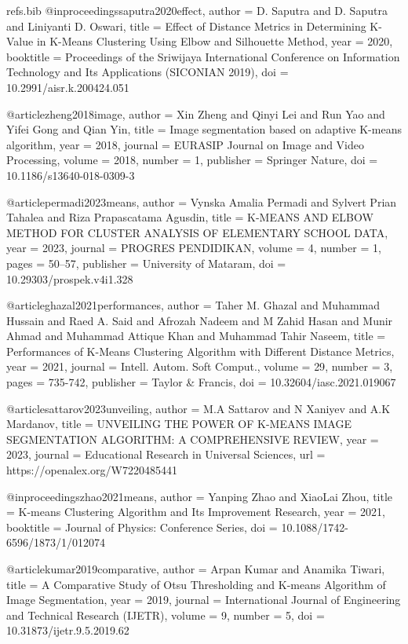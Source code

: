 \begin{filecontents*}[overwrite]{refs.bib}
@inproceedings{saputra2020effect,
  author = {D. Saputra and D. Saputra and Liniyanti D. Oswari},
  title = {{Effect of Distance Metrics in Determining K-Value in K-Means Clustering Using Elbow and Silhouette Method}},
  year = {2020},
  booktitle = {Proceedings of the Sriwijaya International Conference on Information Technology and Its Applications (SICONIAN 2019)},
  doi = {10.2991/aisr.k.200424.051}
}

@article{zheng2018image,
  author = {Xin Zheng and Qinyi Lei and Run Yao and Yifei Gong and Qian Yin},
  title = {{Image segmentation based on adaptive K-means algorithm}},
  year = {2018},
  journal = {EURASIP Journal on Image and Video Processing},
  volume = {2018},
  number = {1},
  publisher = {Springer Nature},
  doi = {10.1186/s13640-018-0309-3}
}

@article{permadi2023means,
  author = {Vynska Amalia Permadi and Sylvert Prian Tahalea and Riza Prapascatama Agusdin},
  title = {{K-MEANS AND ELBOW METHOD FOR CLUSTER ANALYSIS OF ELEMENTARY SCHOOL DATA}},
  year = {2023},
  journal = {PROGRES PENDIDIKAN},
  volume = {4},
  number = {1},
  pages = {50--57},
  publisher = {University of Mataram},
  doi = {10.29303/prospek.v4i1.328}
}

@article{ghazal2021performances,
  author = {Taher M. Ghazal and Muhammad Hussain and Raed A. Said and Afrozah Nadeem and M Zahid Hasan and Munir Ahmad and Muhammad Attique Khan and Muhammad Tahir Naseem},
  title = {{Performances of K-Means Clustering Algorithm with Different Distance Metrics}},
  year = {2021},
  journal = {Intell. Autom. Soft Comput.},
  volume = {29},
  number = {3},
  pages = {735-742},
  publisher = {Taylor \& Francis},
  doi = {10.32604/iasc.2021.019067}
}

@article{sattarov2023unveiling,
  author = {M.A Sattarov and N Xaniyev and A.K Mardanov},
  title = {{UNVEILING THE POWER OF K-MEANS IMAGE SEGMENTATION ALGORITHM: A COMPREHENSIVE REVIEW}},
  year = {2023},
  journal = {Educational Research in Universal Sciences},
  url = {https://openalex.org/W7220485441}
}

@inproceedings{zhao2021means,
  author = {Yanping Zhao and XiaoLai Zhou},
  title = {{K-means Clustering Algorithm and Its Improvement Research}},
  year = {2021},
  booktitle = {Journal of Physics: Conference Series},
  doi = {10.1088/1742-6596/1873/1/012074}
}

@article{kumar2019comparative,
  author = {Arpan Kumar and Anamika Tiwari},
  title = {{A Comparative Study of Otsu Thresholding and K-means Algorithm of Image Segmentation}},
  year = {2019},
  journal = {International Journal of Engineering and Technical Research (IJETR)},
  volume = {9},
  number = {5},
  doi = {10.31873/ijetr.9.5.2019.62}
}


\end{filecontents*}
